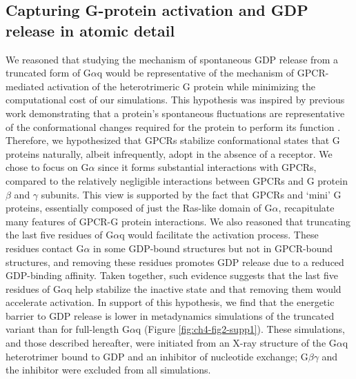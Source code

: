 \documentclass[../main.tex]{subfiles}
\begin{document}
    \subsection{Capturing G-protein activation and GDP release in atomic detail}
        We reasoned that studying the mechanism of spontaneous GDP release from a truncated form of G$\alpha$q would be representative of the mechanism of GPCR-mediated activation of the heterotrimeric G protein while minimizing the computational cost of our simulations. This hypothesis was inspired by previous work demonstrating that a protein’s spontaneous fluctuations are representative of the conformational changes required for the protein to perform its function \cite{Boehr:2006jd,Fraser:2009gv,Changeux:2011fv}. Therefore, we hypothesized that GPCRs stabilize conformational states that G proteins naturally, albeit infrequently, adopt in the absence of a receptor. We chose to focus on G$\alpha$ since it forms substantial interactions with GPCRs, compared to the relatively negligible interactions between GPCRs and G protein $\beta$ and $\gamma$ subunits. This view is supported by the fact that GPCRs and ‘mini’ G proteins, essentially composed of just the Ras-like domain of G$\alpha$, recapitulate many features of GPCR-G protein interactions\cite{Carpenter:2016gr}. We also reasoned that truncating the last five residues of G$\alpha$q would facilitate the activation process. These residues contact G$\alpha$ in some GDP-bound structures but not in GPCR-bound structures\cite{Lambright:1996en,Noel:1993dc}, and removing these residues promotes GDP release due to a reduced GDP-binding affinity\cite{Denker:1992uj,EthanPMarin:2002fr}. Taken together, such evidence suggests that the last five residues of G$\alpha$q help stabilize the inactive state and that removing them would accelerate activation. In support of this hypothesis, we find that the energetic barrier to GDP release is lower in metadynamics simulations of the truncated variant than for full-length G$\alpha$q (Figure \ref{fig:ch4-fig2-supp1}). These simulations, and those described hereafter, were initiated from an X-ray structure of the G$\alpha$q heterotrimer bound to GDP and an inhibitor of nucleotide exchange\cite{Nishimura:2010gt}; G$\beta\gamma$ and the inhibitor were excluded from all simulations.
\end{document}
